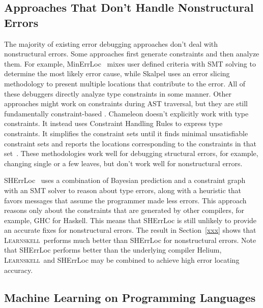 \documentclass[12pt]{report}	%
\newcommand{\newCompiler}{\textsc{Learnskell}}
\begin{document}
\subsection{Approaches That Don't Handle Nonstructural Errors}

The majority of existing error debugging approaches don't
deal with nonstructural errors. Some approaches first generate
constraints and then analyze them. For example, MinErrLoc~\cite{Pavlinovic14:FMT,Pavlinovic15:PST} mixes
user defined criteria with SMT solving to determine the most likely error cause, while
Skalpel \cite{Haack03:TES}
uses an error slicing methodology to present multiple locations that contribute to
the error. All of these debuggers directly analyze type constraints in some manner.
%
Other approaches
might work on constraints during AST traversal, but they are still fundamentally constraint-based
\cite{Lee98:PAF,Lee00:GLP,McAdam02:RTE,Yang00:ETE,Wand86:FST,Duggan95:ETI,Chitil01:CET}.
Chameleon doesn't explicitly work with type constraints. It instead uses
Constraint Handling Rules to express type constraints. It simplifies
the constraint sets until it finds
minimal unsatisfiable constraint sets and reports the locations corresponding to the
constraints in that set~\cite{Stuckey03:ITD,Stuckey04:ITE,Wazny06:TIT}.
These methodologies work well for debugging structural errors, for example, changing
single or a few leaves, but don't work well for nonstructural errors.


SHErrLoc~\cite{Zhang15:DTE}  uses a combination of Bayesian prediction and
a constraint graph with an SMT solver to reason about type errors,
along with a heuristic
that favors messages that assume the programmer made less errors.
%
This approach reasons only about the constraints that are generated by
other compilers, for example, GHC for Haskell.
This means that SHErrLoc is still unlikely
to provide an accurate fixes for nonstructural errors.
The result in Section~\ref{xxx} shows that \newCompiler\
performs much better than SHErrLoc for nonstructural errors.
Note that SHErrLoc performs better than the underlying compiler Helium,
\newCompiler\ and SHErrLoc may be combined 
to achieve high error locating accuracy.

\subsection{Machine Learning on Programming Languages}
\end{document}
